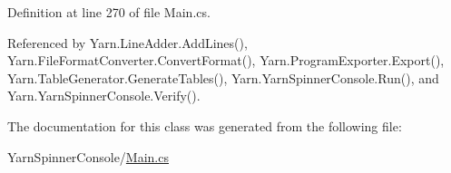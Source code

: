 Definition at line 270 of file Main.\-cs.



Referenced by Yarn.\-Line\-Adder.\-Add\-Lines(), Yarn.\-File\-Format\-Converter.\-Convert\-Format(), Yarn.\-Program\-Exporter.\-Export(), Yarn.\-Table\-Generator.\-Generate\-Tables(), Yarn.\-Yarn\-Spinner\-Console.\-Run(), and Yarn.\-Yarn\-Spinner\-Console.\-Verify().



The documentation for this class was generated from the following file\-:\begin{DoxyCompactItemize}
\item 
Yarn\-Spinner\-Console/\hyperlink{a00313}{Main.\-cs}\end{DoxyCompactItemize}
